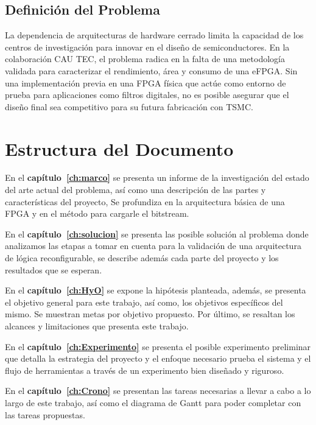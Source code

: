 \subsection{Definición del Problema}

La dependencia de arquitecturas de hardware cerrado limita la capacidad de los centros
de investigación para innovar en el diseño de semiconductores. En la colaboración CAU
TEC, el problema radica en la falta de una metodología validada para caracterizar el
rendimiento, área y consumo de una eFPGA. Sin una implementación previa en una
FPGA física que actúe como entorno de prueba para aplicaciones como filtros digitales,
no es posible asegurar que el diseño final sea competitivo para su futura fabricación con
TSMC.

\section{Estructura del Documento}

En el \textbf{capítulo~\ref{ch:marco}} se presenta un informe de la investigación del 
estado del arte actual del problema, así como una descripción de las partes y 
características del proyecto, Se profundiza en la arquitectura básica de una FPGA 
y en el método para cargarle el bitstream.

\setlength{\parskip}{2.5mm}

En el \textbf{capítulo~\ref{ch:solucion}} se presenta las posible solución al problema 
donde analizamos las etapas a tomar en cuenta para la validación de una arquitectura de 
lógica reconfigurable, se describe además cada parte del proyecto y los resultados que 
se esperan.

\setlength{\parskip}{2.5mm}

En el \textbf{capítulo~\ref{ch:HyO}}  se expone la hipótesis planteada, además, se 
presenta el objetivo general para este trabajo, así como, los objetivos específicos 
del mismo. Se muestran metas por objetivo propuesto. Por último, 
se resaltan los alcances y limitaciones que presenta este trabajo.

\setlength{\parskip}{2.5mm}

En el \textbf{capítulo~\ref{ch:Experimento}} se presenta el posible experimento 
preliminar que detalla la estrategia del proyecto y el enfoque necesario prueba el 
sistema y el flujo de herramientas a través de un experimento bien diseñado y riguroso.

\setlength{\parskip}{2.5mm}

En el \textbf{capítulo~\ref{ch:Crono}}  se presentan las tareas necesarias a llevar a 
cabo a lo largo de este trabajo, así como el diagrama de Gantt para poder completar con las 
tareas propuestas.

\setlength{\parskip}{2.5mm}

